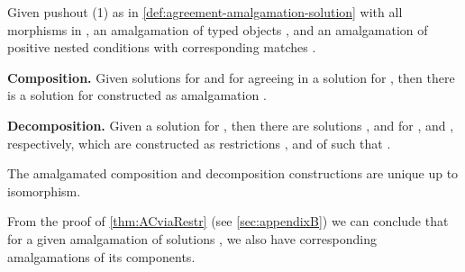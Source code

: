 \begin{theorem}\label{thm:ACviaRestr}
Given pushout (1) as in \autoref{def:agreement-amalgamation-solution} with all morphisms in \M, 
an amalgamation of typed objects ,
and an amalgamation of positive nested conditions  
with corresponding matches .
\begin{description}
	\item \textbf{Composition.}
		Given solutions  for  and  for  agreeing in a solution  for ,
		then there is a solution  for  constructed as 
		amalgamation .
	\item \textbf{Decomposition.}
		Given a solution  for , then there are 
		solutions ,  and  for \linebreak
		,  
		and , respectively, which are constructed as
		restrictions ,  and  of  such that
		.
\end{description}
The amalgamated composition and decomposition constructions are unique up to isomorphism.
\end{theorem}








\begin{remark}\label{rem:amalgamation-solutions}
	From the proof of \autoref{thm:ACviaRestr} (see \autoref{sec:appendixB}) we can conclude that for a given amalgamation of solutions , we also
	have corresponding amalgamations of its components.
\end{remark}